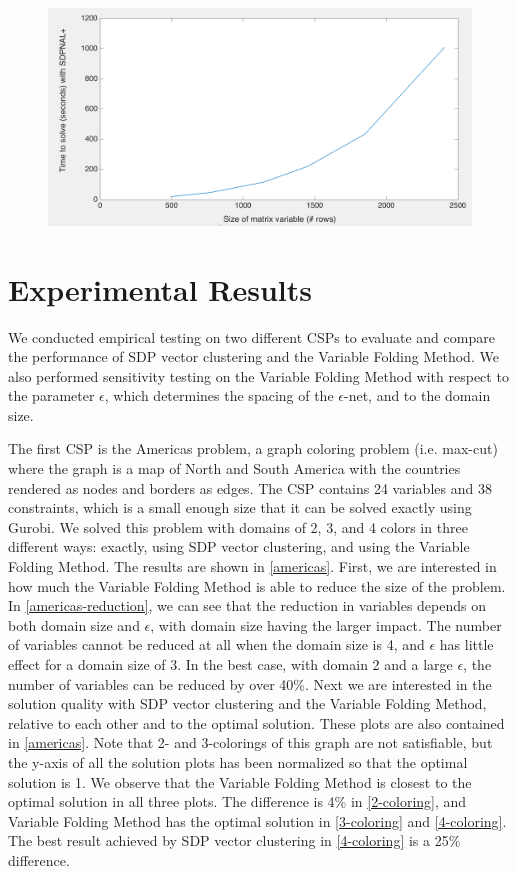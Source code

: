 \documentclass[12pt]{article} %
\begin{document}
\begin{figure}
\includegraphics[width=\textwidth]{images/runtime}
\end{figure}

\section{Experimental Results}

We conducted empirical testing on two different CSPs to evaluate and compare the performance of SDP vector clustering and the Variable Folding Method. We also performed sensitivity testing on the Variable Folding Method with respect to the parameter $\epsilon$, which determines the spacing of the $\epsilon$-net, and to the domain size.

The first CSP is the Americas problem, a graph coloring problem (i.e. max-cut) where the graph is a map of North and South America with the countries rendered as nodes and borders as edges. The CSP contains 24 variables and 38 constraints, which is a small enough size that it can be solved exactly using Gurobi. We solved this problem with domains of 2, 3, and 4 colors in three different ways: exactly, using SDP vector clustering, and using the Variable Folding Method. The results are shown in \autoref{americas}. First, we are interested in how much the Variable Folding Method is able to reduce the size of the problem. In \autoref{americas-reduction}, we can see that the reduction in variables depends on both domain size and $\epsilon$, with domain size having the larger impact. The number of variables cannot be reduced at all when the domain size is 4, and $\epsilon$ has little effect for a domain size of 3. In the best case, with domain 2 and a large $\epsilon$, the number of variables can be reduced by over 40\%. Next we are interested in the solution quality with SDP vector clustering and the Variable Folding Method, relative to each other and to the optimal solution. These plots are also contained in \autoref{americas}. Note that 2- and 3-colorings of this graph are not satisfiable, but the y-axis of all the solution plots has been normalized so that the optimal solution is 1. We observe that the Variable Folding Method is closest to the optimal solution in all three plots. The difference is 4\% in \ref{2-coloring}, and Variable Folding Method has the optimal solution in \ref{3-coloring} and \ref{4-coloring}. The best result achieved by SDP vector clustering in \ref{4-coloring} is a 25\% difference.
\end{document}
